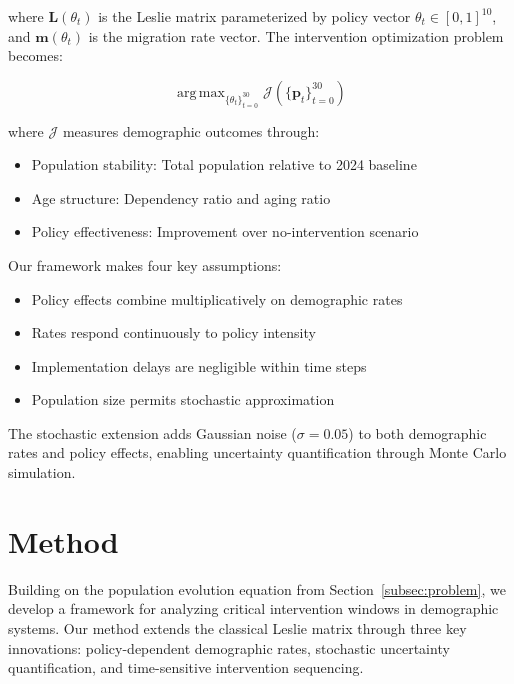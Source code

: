 \documentclass{article} %
\DeclareMathOperator*{\argmax}{arg\,max}
\begin{document}
where $\mathbf{L}(\theta_t)$ is the Leslie matrix parameterized by policy vector $\theta_t \in [0,1]^{10}$, and $\mathbf{m}(\theta_t)$ is the migration rate vector. The intervention optimization problem becomes:

\begin{equation}
\argmax_{\{\theta_t\}_{t=0}^{30}} \mathcal{J}(\{\mathbf{p}_t\}_{t=0}^{30})
\end{equation}

where $\mathcal{J}$ measures demographic outcomes through:
\begin{itemize}
    \item Population stability: Total population relative to 2024 baseline
    \item Age structure: Dependency ratio and aging ratio
    \item Policy effectiveness: Improvement over no-intervention scenario
\end{itemize}

Our framework makes four key assumptions:
\begin{itemize}
    \item Policy effects combine multiplicatively on demographic rates
    \item Rates respond continuously to policy intensity
    \item Implementation delays are negligible within time steps
    \item Population size permits stochastic approximation
\end{itemize}

The stochastic extension adds Gaussian noise ($\sigma = 0.05$) to both demographic rates and policy effects, enabling uncertainty quantification through Monte Carlo simulation.

\section{Method}
\label{sec:method}

Building on the population evolution equation from Section~\ref{subsec:problem}, we develop a framework for analyzing critical intervention windows in demographic systems. Our method extends the classical Leslie matrix through three key innovations: policy-dependent demographic rates, stochastic uncertainty quantification, and time-sensitive intervention sequencing.
\end{document}
